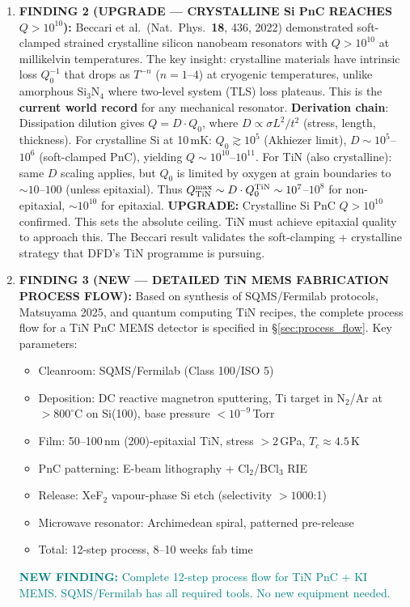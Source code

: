 \documentclass[11pt]{article}
\theoremstyle{remark}
\newcommand{\newfinding}[1]{\textcolor{teal}{\textbf{NEW FINDING:} #1}}
\newcommand{\upgrade}[1]{\textcolor{blue!70!black}{\textbf{UPGRADE:} #1}}
\begin{document}
\begin{tcolorbox}[colback=blue!5!white, colframe=blue!50!black,
  title=\textbf{W4i19 TOP 5 FINDINGS --- Ranked by Programme Impact}]
\begin{enumerate}
\item \textbf{FINDING 2 (UPGRADE --- CRYSTALLINE Si PnC REACHES $Q > 10^{10}$):}
Beccari et al.\ (Nat.\ Phys.\ \textbf{18}, 436, 2022) demonstrated
soft-clamped strained crystalline silicon nanobeam resonators with
$Q > 10^{10}$ at millikelvin temperatures. The key insight: crystalline
materials have intrinsic loss $Q_0^{-1}$ that drops as $T^{-n}$
($n = 1$--$4$) at cryogenic temperatures, unlike amorphous Si$_3$N$_4$
where two-level system (TLS) loss plateaus. This is the \textbf{current
world record} for any mechanical resonator.
\textbf{Derivation chain}: Dissipation dilution gives
$Q = D \cdot Q_0$, where $D \propto \sigma L^2/t^2$ (stress, length,
thickness). For crystalline Si at 10\,mK: $Q_0 \gtrsim 10^5$
(Akhiezer limit), $D \sim 10^5$--$10^6$ (soft-clamped PnC), yielding
$Q \sim 10^{10}$--$10^{11}$. For TiN (also crystalline): same
$D$ scaling applies, but $Q_0$ is limited by oxygen at grain
boundaries to $\sim 10$--$100$ (unless epitaxial). Thus
$Q_{\rm TiN}^{\rm max} \sim D \cdot Q_0^{\rm TiN} \sim 10^7$--$10^8$
for non-epitaxial, $\sim 10^{10}$ for epitaxial.
\upgrade{Crystalline Si PnC $Q > 10^{10}$ confirmed. This sets the
absolute ceiling. TiN must achieve epitaxial quality to approach this.
The Beccari result validates the soft-clamping + crystalline strategy
that DFD's TiN programme is pursuing.}

\item \textbf{FINDING 3 (NEW --- DETAILED TiN MEMS FABRICATION PROCESS FLOW):}
Based on synthesis of SQMS/Fermilab protocols, Matsuyama 2025, and
quantum computing TiN recipes, the complete process flow for a TiN PnC
MEMS detector is specified in \S\ref{sec:process_flow}. Key parameters:
\begin{itemize}[nosep]
  \item Cleanroom: SQMS/Fermilab (Class 100/ISO 5)
  \item Deposition: DC reactive magnetron sputtering, Ti target in
    N$_2$/Ar at $> 800^\circ$C on Si(100), base pressure
    $< 10^{-9}$\,Torr
  \item Film: 50--100\,nm (200)-epitaxial TiN, stress $> 2$\,GPa,
    $T_c \approx 4.5$\,K
  \item PnC patterning: E-beam lithography + Cl$_2$/BCl$_3$ RIE
  \item Release: XeF$_2$ vapour-phase Si etch (selectivity $> 1000$:1)
  \item Microwave resonator: Archimedean spiral, patterned pre-release
  \item Total: 12-step process, 8--10 weeks fab time
\end{itemize}
\newfinding{Complete 12-step process flow for TiN PnC + KI MEMS.
SQMS/Fermilab has all required tools. No new equipment needed.}


\end{enumerate}
\end{tcolorbox}
\end{document}
